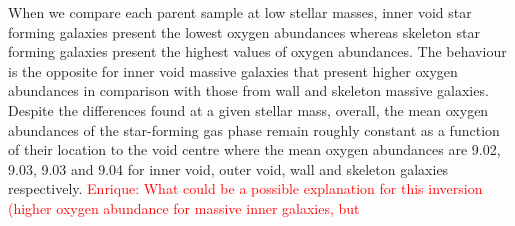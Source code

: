 \documentclass[a4paper,fleqn,usenatbib,letter]{mnras}
\begin{document}
When we compare each parent sample at low stellar masses, inner void star forming galaxies present  the lowest oxygen abundances  whereas  skeleton star forming galaxies present the highest values of oxygen abundances. The behaviour is the opposite for inner void massive galaxies that  present higher oxygen abundances in comparison with those from wall and skeleton massive  galaxies. Despite the differences found at a given stellar mass, overall, the mean oxygen abundances of the star-forming gas phase remain roughly constant as a function of  their location to the void centre where the mean oxygen abundances are 9.02, 9.03, 9.03 and 9.04  for  inner void, outer void, wall and skeleton galaxies respectively. \textcolor{red}{Enrique: What could be a possible explanation for this inversion (higher oxygen abundance for massive inner galaxies, but }




	

\end{document}
